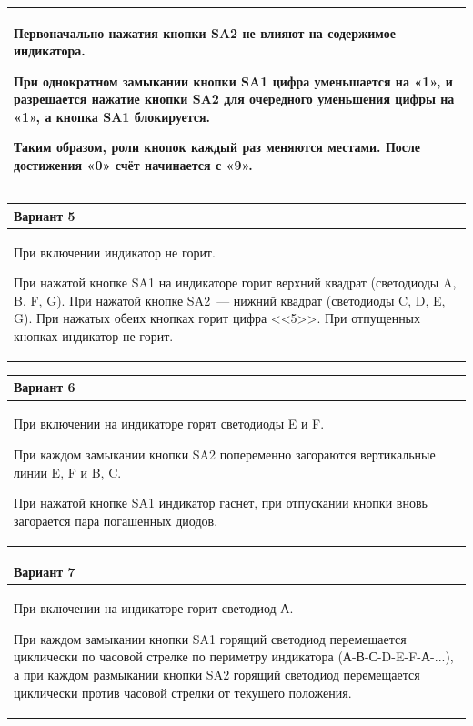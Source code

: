 \documentclass[main.tex]{subfiles}
\begin{document}
\begin{small}
\begin{tabularx}{\textwidth}{|X|}
Первоначально нажатия кнопки SA2 не влияют на содержимое индикатора.

При однократном замыкании кнопки SA1 цифра уменьшается на «1», и разрешается нажатие кнопки SA2 для очередного уменьше­ния цифры на «1», а кнопка SA1 блокируется.

Таким образом, роли кнопок каждый раз меняются местами. После достижения «0» счёт начинается с «9».\\
\hline
\end{tabularx}

\vspace{6px}
\noindent 
\begin{tabularx}{\textwidth}{|X|}
\hline
\textbf{Вариант 5}\\
\hline
При включении индикатор не горит.

При нажатой кнопке SA1 на индикаторе горит верхний квадрат (светодиоды A, B, F, G). При нажатой кнопке SA2~--- нижний квад­рат (светодиоды C, D, E, G). При нажатых обеих кнопках горит цифра <<5>>. При отпущенных кнопках индикатор не горит.\\
\hline
\end{tabularx}

\vspace{6px}
\noindent 
\begin{tabularx}{\textwidth}{|X|}
\hline
\textbf{Вариант 6}\\
\hline
При включении на индикаторе горят светодиоды E и F.

При каждом замыкании кнопки SA2 попеременно загораются вертикальные линии E, F и B, C.

При нажатой кнопке SA1 индикатор гаснет, при отпускании кнопки вновь загорается пара погашенных диодов.\\
\hline
\end{tabularx}

\newpage

\vspace{6px}
\noindent 
\begin{tabularx}{\textwidth}{|X|}
\hline
\textbf{Вариант 7}\\
\hline
При включении на индикаторе горит светодиод А.

При каждом замыкании кнопки SA1 горящий светодиод перемещается циклически по часовой стрелке по периметру индикатора (А-В-С-D-E-F-А-...), а при каждом размыкании кнопки SA2 горя­щий светодиод перемещается циклически против часовой стрелки от текущего положения.\\
\hline
\end{tabularx}


\end{small}
\end{document}
